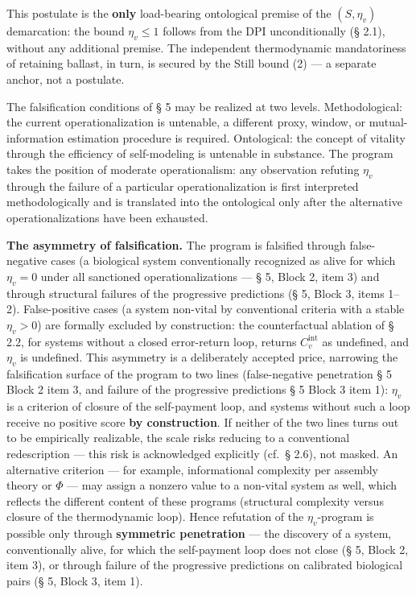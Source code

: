 \documentclass[pdflatex,sn-mathphys-ay]{sn-jnl}
\begin{document}
This postulate is the \textbf{only} load-bearing ontological premise of the \((S, \eta_v)\) demarcation: the bound \(\eta_v \le 1\) follows from the DPI unconditionally (§ 2.1), without any additional premise. The independent thermodynamic mandatoriness of retaining ballast, in turn, is secured by the Still bound (2) --- a separate anchor, not a postulate.

The falsification conditions of § 5 may be realized at two levels. Methodological: the current operationalization is untenable, a different proxy, window, or mutual-information estimation procedure is required. Ontological: the concept of vitality through the efficiency of self-modeling is untenable in substance. The program takes the position of moderate operationalism: any observation refuting \(\eta_v\) through the failure of a particular operationalization is first interpreted methodologically and is translated into the ontological only after the alternative operationalizations have been exhausted.

\textbf{The asymmetry of falsification.} The program is falsified through false-negative cases (a biological system conventionally recognized as alive for which \(\eta_v = 0\) under all sanctioned operationalizations --- § 5, Block 2, item 3) and through structural failures of the progressive predictions (§ 5, Block 3, items 1--2). False-positive cases (a system non-vital by conventional criteria with a stable \(\eta_v > 0\)) are formally excluded by construction: the counterfactual ablation of § 2.2, for systems without a closed error-return loop, returns \(C_v^{\text{int}}\) as undefined, and \(\eta_v\) is undefined. This asymmetry is a deliberately accepted price, narrowing the falsification surface of the program to two lines (false-negative penetration § 5 Block 2 item 3, and failure of the progressive predictions § 5 Block 3 item 1): \(\eta_v\) is a criterion of closure of the self-payment loop, and systems without such a loop receive no positive score \textbf{by construction}. If neither of the two lines turns out to be empirically realizable, the scale risks reducing to a conventional redescription --- this risk is acknowledged explicitly (cf.~§ 2.6), not masked. An alternative criterion --- for example, informational complexity per assembly theory or \(\Phi\) --- may assign a nonzero value to a non-vital system as well, which reflects the different content of these programs (structural complexity versus closure of the thermodynamic loop). Hence refutation of the \(\eta_v\)-program is possible only through \textbf{symmetric penetration} --- the discovery of a system, conventionally alive, for which the self-payment loop does not close (§ 5, Block 2, item 3), or through failure of the progressive predictions on calibrated biological pairs (§ 5, Block 3, item 1).
\end{document}
